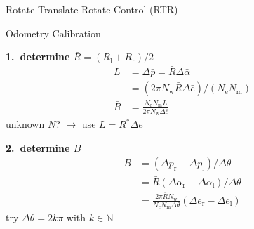 \documentclass{beamer}
\begin{document}
\begin{frame}{Rotate-Translate-Rotate Control (RTR)}
  
  \def\svgwidth{\columnwidth}
  
  
\end{frame}


\begin{frame}{Odometry Calibration}
  
  \centering
  
  \vfill
  
  \begin{minipage}[t]{0.45\columnwidth}
    \textbf{1.\ determine $\bar{R} = (R_\text{l}+R_\text{r})/2$}
    \begin{align*}
      L
      &=
      \Delta\bar{p} = \bar{R} \Delta\bar{\alpha}
      \\
      &=
      (2 \pi N_\text{w} \bar{R} \Delta{\bar{e}}) / (N_\text{e} N_\text{m})
      \\
      \bar{R}
      &=
      \frac{N_\text{e} N_\text{m} L}{2\pi N_\text{w} \Delta\bar{e}}
    \end{align*}
    unknown $N$? $\rightarrow$ use $L = R^\ast\Delta{\bar{e}}$
  \end{minipage}
  \hfill
  \begin{minipage}[t]{0.45\columnwidth}
    \textbf{2.\ determine $B$}
    \begin{align*}
      B
      &=
      (\Delta p_\text{r} - \Delta p_\text{l}) / \Delta\theta
      \\
      &=
      \bar{R}(\Delta\alpha_\text{r} - \Delta\alpha_\text{l}) / \Delta\theta
      \\
      &=
      \frac{2\pi\bar{R}N_\text{w}}{N_\text{e}N_\text{m} \Delta\theta} (\Delta e_\text{r} - \Delta e_\text{l})
    \end{align*}
    try $\Delta\theta = 2k\pi$ with $k\in\mathbb{N}$
  \end{minipage}
    
\end{frame}
\end{document}
